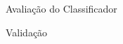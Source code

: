 \begin{section}{Avaliação do Classificador}
\begin{subsection}{Validação}
		

\end{subsection}	
\end{section}

